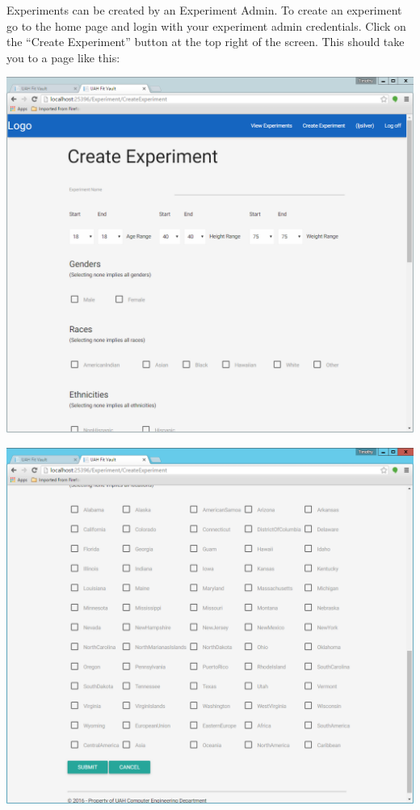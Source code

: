 \documentclass[letterpaper,10pt,english]{sphinxmanual}
\begin{document}
Experiments can be created by an Experiment Admin. To create an experiment go to the home page and login with your
experiment admin credentials. Click on the ``Create Experiment'' button at the top right of the screen. This should
take you to a page like this:

\includegraphics{create_experiment_1.png}

\includegraphics{create_experiment_2.png}
\end{document}
